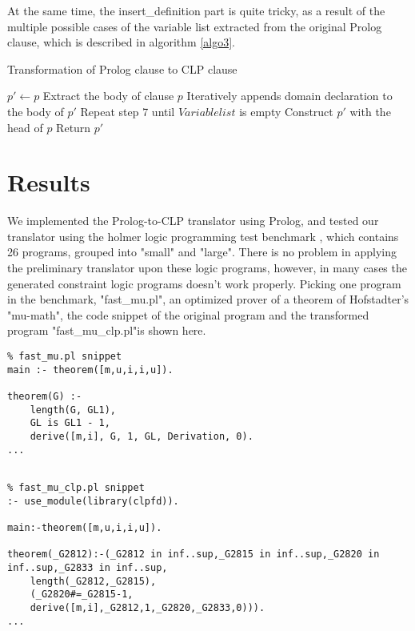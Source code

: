 \documentclass[12pt]{article}
\begin{document}
At the same time, the insert\_definition part is quite tricky, as a result of the multiple possible cases of the variable list extracted from the original Prolog clause, which is described in algorithm \ref{algo3}.

\begin{algorithm}
\caption{Transformation of Prolog clause to CLP clause}
\label{algo3}
\begin{algorithmic}[1]
 	    \State $p'\gets p$
 	\Else
		 \State Extract the body of clause $p$
 		 \State Iteratively appends domain declaration to the body of $p'$
 		 \State Repeat step 7 until $Variablelist$ is empty
 		 \State Construct $p'$ with the head of $p$
 	\EndIf	
	\State Return $p'$
\EndProcedure
\end{algorithmic}
\end{algorithm}

\section{Results}\label{results}
We implemented the Prolog-to-CLP translator using Prolog, and tested our translator using the holmer logic programming test benchmark \cite{holmer1990fast}, which contains 26 programs, grouped into "small" and "large".  There is no problem in applying the preliminary translator upon these logic programs, however, in many cases the generated constraint logic programs doesn't work properly.  Picking one program in the benchmark, "fast\_mu.pl", an optimized prover of a theorem of Hofstadter's "mu-math",  the code snippet of the original program and the transformed program "fast\_mu\_clp.pl"is shown here.

\begin{lstlisting}
% fast_mu.pl snippet
main :- theorem([m,u,i,i,u]).

theorem(G) :-
	length(G, GL1),
	GL is GL1 - 1,
	derive([m,i], G, 1, GL, Derivation, 0).
...
	
\end{lstlisting}

\begin{lstlisting}
% fast_mu_clp.pl snippet
:- use_module(library(clpfd)).

main:-theorem([m,u,i,i,u]).

theorem(_G2812):-(_G2812 in inf..sup,_G2815 in inf..sup,_G2820 in inf..sup,_G2833 in inf..sup, 
	length(_G2812,_G2815),
	(_G2820#=_G2815-1,
	derive([m,i],_G2812,1,_G2820,_G2833,0))).
...
	
\end{lstlisting}
\end{document}
